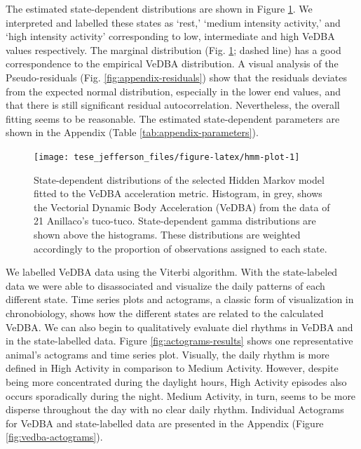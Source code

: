 \documentclass[english,msc,numbers,hidelinks]{coppe}
\begin{document}
  The estimated state-dependent distributions are shown in Figure \ref{fig:hmm-plot}. We interpreted and labelled these states as `rest,' `medium intensity activity,' and `high intensity activity' corresponding to low, intermediate and high VeDBA values respectively. The marginal distribution (Fig. \ref{fig:hmm-plot}; dashed line) has a good correspondence to the empirical VeDBA distribution. A visual analysis of the Pseudo-residuals (Fig. \ref{fig:appendix-residuals}) show that the residuals deviates from the expected normal distribution, especially in the lower end values, and that there is still significant residual autocorrelation. Nevertheless, the overall fitting seems to be reasonable. The estimated state-dependent parameters are shown in the Appendix (Table \ref{tab:appendix-parameters}).
  \begin{figure}

  {\centering \texttt{[image: tese\_jefferson\_files/figure-latex/hmm-plot-1]} 

  }

  \caption{State-dependent distributions of the selected Hidden Markov model fitted to the VeDBA acceleration metric. Histogram, in grey, shows the Vectorial Dynamic Body Acceleration (VeDBA) from the data of 21 Anillaco's tuco-tuco. State-dependent gamma distributions are shown above the histograms. These distributions are weighted accordingly to the proportion of observations assigned to each state.}\label{fig:hmm-plot}
  \end{figure}
  We labelled VeDBA data using the Viterbi algorithm. With the state-labeled data we were able to disassociated and visualize the daily patterns of each different state. Time series plots and actograms, a classic form of visualization in chronobiology, shows how the different states are related to the calculated VeDBA. We can also begin to qualitatively evaluate diel rhythms in VeDBA and in the state-labelled data. Figure \ref{fig:actograms-results} shows one representative animal's actograms and time series plot. Visually, the daily rhythm is more defined in High Activity in comparison to Medium Activity. However, despite being more concentrated during the daylight hours, High Activity episodes also occurs sporadically during the night. Medium Activity, in turn, seems to be more disperse throughout the day with no clear daily rhythm. Individual Actograms for VeDBA and state-labelled data are presented in the Appendix (Figure \ref{fig:vedba-actograms}).
\end{document}
